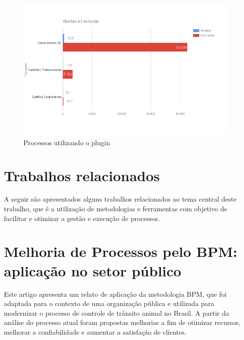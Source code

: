\begin{figure}[H]
\centering
\includegraphics[width=1\textwidth]{imagens/grafico_processo.png}
\caption{Processos utilizando o plugin}
\label{fig:grafico_processo}
\end{figure}

\section{Trabalhos relacionados}\label{sec:resultado-relacionados}

A seguir são apresentados alguns trabalhos relacionados ao tema central deste trabalho, que é a utilização de metodologias e ferramentas com objetivo de facilitar e otimizar a gestão e execução de processos.

\section{Melhoria de Processos pelo BPM: aplicação no setor público}\label{sec:resultado-relacionados-caso_setor_publico}
Este artigo \cite{artigo_relacionado_setor_publico} apresenta um relato de aplicação da metodologia BPM, que foi adaptada para o contexto de uma organização pública e utilizada para modernizar o processo de controle de trânsito animal no Brasil. A partir da análise do processo atual foram propostas melhorias a fim de otimizar recursos, melhorar a confiabilidade e aumentar a satisfação de clientes.